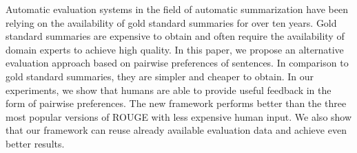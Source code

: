 Automatic evaluation systems in the field of automatic summarization have been relying on the availability of gold standard summaries for over ten years. Gold standard summaries are expensive to obtain and often require the availability of domain experts to achieve high quality. In this paper, we propose an alternative evaluation approach based on pairwise preferences of sentences. In comparison to gold standard summaries, they are simpler and cheaper to obtain. In our experiments, we show that humans are able to provide useful feedback in the form of pairwise preferences. The new framework performs better than the three most popular versions of ROUGE with less expensive human input. We also show that our framework can reuse already available evaluation data and achieve even better results.
